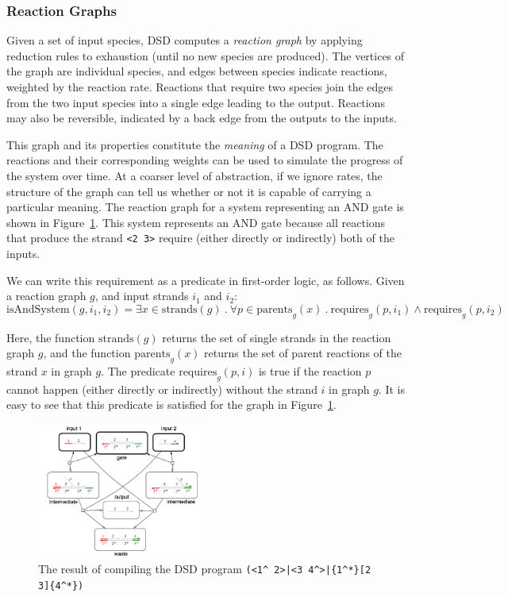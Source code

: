 \documentclass{article}[10pt]
\begin{document}
\subsubsection{Reaction Graphs}

Given a set of input species, DSD computes a \emph{reaction graph} by applying
reduction rules to exhaustion (until no new species are produced). The vertices
of the graph are individual species, and edges between species indicate
reactions, weighted by the reaction rate. Reactions that require two species
join the edges from the two input species into a single edge leading to the
output. Reactions may also be reversible, indicated by a back edge from the
outputs to the inputs.

This graph
and its properties constitute the \emph{meaning} of a DSD program.
The reactions and their corresponding weights can be used to simulate
the progress of the system over time. At a coarser level of abstraction,
if we ignore rates, the structure of the graph can tell us whether or not
it is capable of carrying a particular meaning. The reaction
graph for a system representing an AND gate is shown in
Figure~\ref{figure:and-gate}. This system represents an AND gate
because all reactions that produce the strand \verb;<2 3>;
require (either directly or indirectly) both of the inputs.

We can write this requirement as a predicate in first-order logic, as
follows. Given a reaction graph $g$, and input strands $i_1$ and $i_2$:
\begin{equation}
\mathrm{isAndSystem}(g, i_1, i_2) =
\exists x \in \mathrm{strands}(g)\ .\ 
\forall p \in \mathrm{parents}_g(x)\ .\ 
\mathrm{requires}_g(p, i_1) \land \mathrm{requires}_g(p, i_2)
\label{eq:and-sys}
\end{equation}

Here, the function $\mathrm{strands}(g)$ returns the set of single strands in
the reaction graph $g$, and the function $\mathrm{parents}_g(x)$ returns
the set of parent reactions of the strand $x$ in graph $g$. The predicate 
$\mathrm{requires}_g(p,i)$ is true if the reaction $p$ cannot happen
(either directly or indirectly) without the strand $i$ in graph $g$.
It is easy to see that this predicate is satisfied for the graph in
Figure~\ref{figure:and-gate}.

\begin{figure}
\centering
\includegraphics[width=0.5\textwidth]{figures/and-gate.png}
\caption{
The result of compiling the DSD program
\texttt{(<1\^{} 2>|<3 4\^{}>|\{1\^{}*\}[2 3]\{4\^{}*\})}
}
\label{figure:and-gate}
\end{figure}
\end{document}
